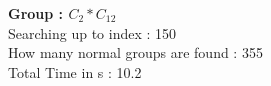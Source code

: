 \textbf{Group : $C_2*C_{12}$}\\
Searching up to index : 150\\
How many normal groups are found : 355\\
Total Time in s : 10.2\\
